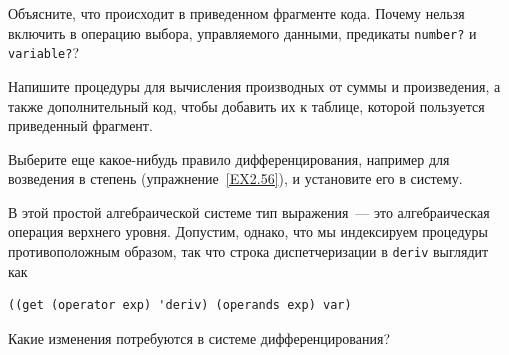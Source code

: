 \begin{exercise}{2.73}
\begin{plainenum}
\item
 Объясните, что происходит в приведенном фрагменте
кода.  Почему нельзя включить в операцию выбора, управляемого данными,
предикаты {\tt number?} и {\tt vari\-able?}?

\item
 Напишите процедуры для вычисления производных от
суммы и произведения, а также дополнительный код,
чтобы добавить их к таблице, которой пользуется приведенный фрагмент.

\item
 Выберите еще какое-нибудь правило
дифференцирования, например для возведения в степень 
(упражнение~\ref{EX2.56}), и установите его в систему.

\item
 В этой простой алгебраической системе тип
выражения~--- это алгебраическая операция верхнего уровня.  Допустим,
однако, что мы индексируем процедуры противоположным образом, так что
строка диспетчеризации в {\tt deriv} выглядит как

\begin{Verbatim}[fontsize=\small]
((get (operator exp) 'deriv) (operands exp) var)
\end{Verbatim}
Какие изменения потребуются в системе дифференцирования?
\end{plainenum}
\end{exercise}

